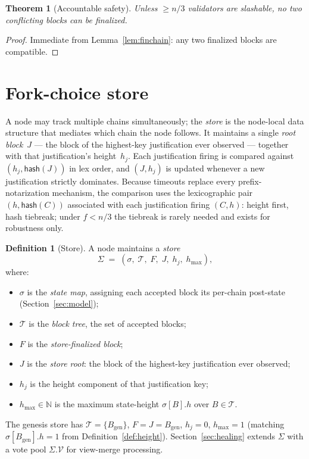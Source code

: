 \ifx\litemode\undefined\documentclass{article}\fi
\newcommand{\genesis}{\ensuremath{B_{\mathrm{gen}}}}
\newcommand{\T}[0]{\ensuremath{\mathcal{T}}}
\newcommand{\hash}{\mathsf{hash}}
\newcommand{\hmax}{\ensuremath{h_{\max}}\xspace}
\theoremstyle{plain}
\newtheorem{theorem}{Theorem}
\theoremstyle{definition}
\newtheorem{definition}{Definition}
\theoremstyle{remark}
\begin{document}
\begin{theorem}[Accountable safety]\label{thm:safety}
Unless $\geq n/3$ validators are slashable, no two conflicting blocks can be finalized.
\end{theorem}

\begin{proof}
Immediate from Lemma~\ref{lem:finchain}: any two finalized blocks are compatible.
\end{proof}
\section{Fork-choice store}\label{sec:store}

A node may track multiple chains simultaneously; the \emph{store} is the node-local data structure that mediates which chain the node follows.
It maintains a single \emph{root block}~$J$ --- the block of the highest-key justification ever observed --- together with that justification's height~$h_j$.
Each justification firing is compared against $(h_j, \hash(J))$ in lex order, and $(J, h_j)$ is updated whenever a new justification strictly dominates.
Because timeouts replace every prefix-notarization mechanism, the comparison uses the lexicographic pair $(h, \hash(C))$ associated with each justification firing $(C, h)$: height first, hash tiebreak; under $f < n/3$ the tiebreak is rarely needed and exists for robustness only.

\begin{definition}[Store]\label{def:store}
A node maintains a \emph{store}
\[
  \Sigma \;=\; (\sigma,\; \T,\; F,\; J,\; h_j,\; \hmax),
\]
where:
\begin{itemize}
  \item $\sigma$ is the \emph{state map}, assigning each accepted block its per-chain post-state (Section~\ref{sec:model});
  \item $\T$ is the \emph{block tree}, the set of accepted blocks;
  \item $F$ is the \emph{store-finalized block};
  \item $J$ is the \emph{store root}: the block of the highest-key justification ever observed;
  \item $h_j$ is the height component of that justification key;
  \item $\hmax \in \mathbb{N}$ is the maximum state-height $\sigma[B].h$ over $B \in \T$.
\end{itemize}
The genesis store has $\T = \{\genesis\}$, $F = J = \genesis$, $h_j = 0$, $\hmax = 1$ (matching $\sigma[\genesis].h = 1$ from Definition~\ref{def:height}).
Section~\ref{sec:healing} extends $\Sigma$ with a vote pool $\Sigma.\mathcal{V}$ for view-merge processing.
\end{definition}
\end{document}
